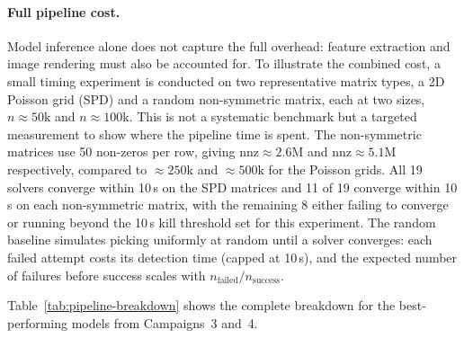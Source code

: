 \paragraph{Full pipeline cost.}
Model inference alone does not capture the full overhead: feature extraction and image rendering must also be accounted for.
To illustrate the combined cost, a small timing experiment is conducted on two representative matrix types, a 2D Poisson grid (SPD) and a random non-symmetric matrix, each at two sizes, $n \approx 50\text{k}$ and $n \approx 100\text{k}$.
This is not a systematic benchmark but a targeted measurement to show where the pipeline time is spent.
The non-symmetric matrices use 50 non-zeros per row, giving $\text{nnz} \approx 2.6\text{M}$ and $\text{nnz} \approx 5.1\text{M}$ respectively, compared to $\approx 250\text{k}$ and $\approx 500\text{k}$ for the Poisson grids.
All 19 solvers converge within 10\,s on the SPD matrices and 11 of 19 converge within 10\,s on each non-symmetric matrix, with the remaining 8 either failing to converge or running beyond the 10\,s kill threshold set for this experiment.
The random baseline simulates picking uniformly at random until a solver converges: each failed attempt costs its detection time (capped at 10\,s), and the expected number of failures before success scales with $n_\text{failed}/n_\text{success}$.

Table~\ref{tab:pipeline-breakdown} shows the complete breakdown for the best-performing models from Campaigns~3 and~4.

